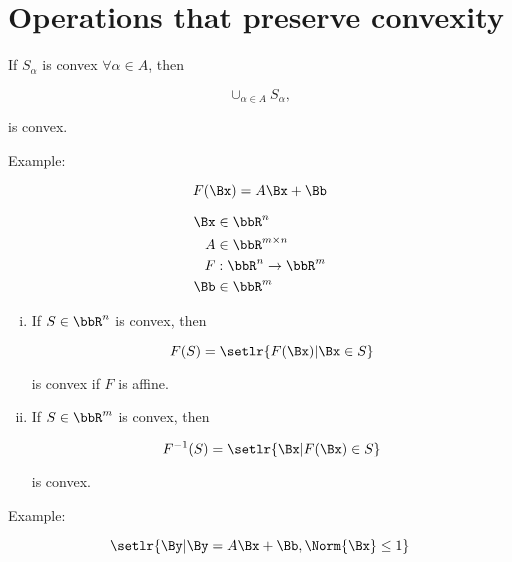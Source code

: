 \section{Operations that preserve convexity}

If \( S_\alpha \) is convex \( \forall \alpha \in A \), then

\begin{dmath}\label{eqn:convexOptimizationLecture5:40}
\cup_{\alpha \in A} S_\alpha,
\end{dmath}

is convex.

Example:

\begin{equation}\label{eqn:convexOptimizationLecture5:60}
F(\Bx) = A \Bx + \Bb
\end{equation}

\begin{equation}\label{eqn:convexOptimizationLecture5:80}
\begin{aligned}
\Bx &\in \bbR^n \\
A &\in \bbR^{m \times n} \\
F &: \bbR^{n} \rightarrow \bbR^m \\
\Bb &\in \bbR^m
\end{aligned}
\end{equation}


\begin{enumerate}[(i)]
\item
If \( S \in \bbR^n \) is convex, then

\begin{equation}\label{eqn:convexOptimizationLecture5:100}
F(S) = \setlr{ F(\Bx) | \Bx \in S }
\end{equation}

is convex if \( F \) is affine.
\item

If \( S \in \bbR^m \) is convex, then

\begin{equation}\label{eqn:convexOptimizationLecture5:120}
F^{-1}(S) = \setlr{ \Bx | F(\Bx) \in S }
\end{equation}

is convex.
\end{enumerate}

Example:

\begin{equation}\label{eqn:convexOptimizationLecture5:140}
\setlr{ \By | \By = A \Bx + \Bb, \Norm{\Bx} \le 1}
\end{equation}


